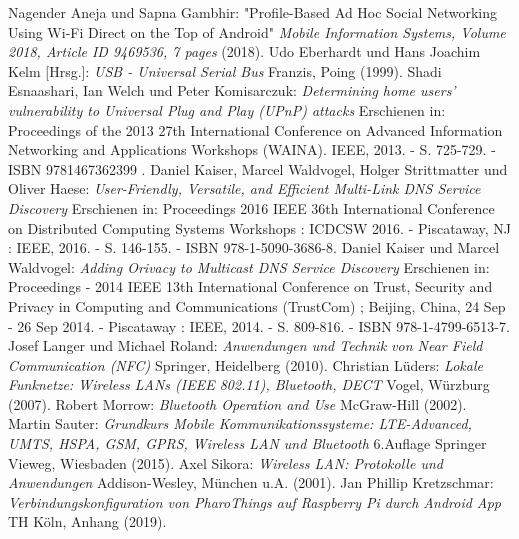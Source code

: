\documentclass[12pt,a4paper]{article}
\begin{document}
    \renewcommand\refname{Literaturverzeichnis}
    \begin{thebibliography}{10}
        Nagender Aneja und Sapna Gambhir: "Profile-Based Ad Hoc Social Networking Using Wi-Fi Direct on the Top of Android" {\it Mobile Information Systems, Volume 2018, Article ID 9469536, 7 pages} (2018).
         Udo Eberhardt und Hans Joachim Kelm [Hrsg.]: {\it USB - Universal Serial Bus} Franzis, Poing (1999).
         Shadi Esnaashari, Ian Welch und Peter Komisarczuk: {\it Determining home users' vulnerability to Universal Plug and Play (UPnP) attacks} Erschienen in: Proceedings of the 2013 27th International Conference on Advanced Information Networking and Applications Workshops (WAINA). IEEE, 2013. - S. 725-729. - ISBN 9781467362399 .
         Daniel Kaiser, Marcel Waldvogel, Holger Strittmatter und Oliver Haese: {\it User-Friendly, Versatile, and Efficient Multi-Link DNS Service Discovery} Erschienen in: Proceedings 2016 IEEE 36th International Conference on Distributed Computing Systems Workshops : ICDCSW 2016. - Piscataway, NJ : IEEE, 2016. - S. 146-155. - ISBN 978-1-5090-3686-8.
         Daniel Kaiser und Marcel Waldvogel: {\it Adding Orivacy to Multicast DNS Service Discovery} Erschienen in: Proceedings - 2014 IEEE 13th International Conference on Trust, Security and Privacy in Computing and Communications (TrustCom) ; Beijing, China, 24 Sep - 26 Sep 2014. - Piscataway : IEEE, 2014. - S. 809-816. - ISBN 978-1-4799-6513-7.
        Josef Langer und Michael Roland: {\it Anwendungen und Technik von Near Field Communication (NFC)} Springer, Heidelberg (2010).
        Christian Lüders: {\it Lokale Funknetze: Wireless LANs (IEEE 802.11), Bluetooth, DECT} Vogel, Würzburg (2007).
        Robert Morrow: {\it Bluetooth Operation and Use} McGraw-Hill (2002).
        Martin Sauter: {\it Grundkurs Mobile Kommunikationssysteme: LTE-Advanced, UMTS, HSPA, GSM, GPRS, Wireless LAN und Bluetooth} 6.Auflage Springer Vieweg, Wiesbaden (2015).
        Axel Sikora: {\it Wireless LAN: Protokolle und Anwendungen} Addison-Wesley, München u.A. (2001).
		 Jan Phillip Kretzschmar: {\it Verbindungskonfiguration von PharoThings auf Raspberry Pi durch Android App} TH Köln, Anhang (2019).
    \end{thebibliography}
    \pagebreak
    
\end{document}

